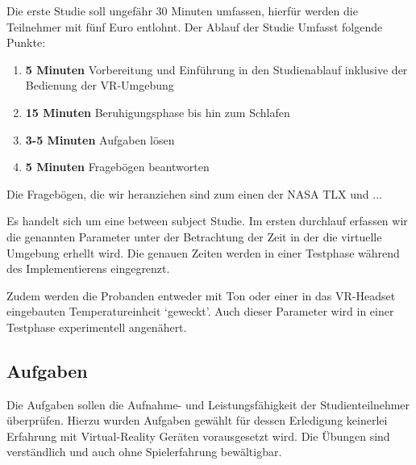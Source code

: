Die erste Studie soll ungefähr 30 Minuten umfassen, hierfür werden die Teilnehmer mit fünf Euro entlohnt. Der Ablauf der Studie Umfasst folgende Punkte:

\begin{enumerate}
	\item \textbf{5 Minuten} Vorbereitung und Einführung in den Studienablauf inklusive der Bedienung der VR-Umgebung
	\item \textbf{15 Minuten} Beruhigungsphase bis hin zum Schlafen
	\item \textbf{3-5 Minuten} Aufgaben lösen
	\item \textbf{5 Minuten} Fragebögen beantworten
\end{enumerate}

Die Fragebögen, die wir heranziehen sind zum einen der NASA TLX und ...

Es handelt sich um eine between subject Studie. Im ersten durchlauf erfassen wir die genannten Parameter unter der Betrachtung der Zeit in der die virtuelle Umgebung erhellt wird. Die genauen Zeiten werden in einer Testphase während des Implementierens eingegrenzt.

Zudem werden die Probanden entweder mit Ton oder einer in das VR-Headset eingebauten Temperatureinheit `geweckt'. Auch dieser Parameter wird in einer Testphase experimentell angenähert.

\subsection{Aufgaben}
Die Aufgaben sollen die Aufnahme- und Leistungsfähigkeit der Studienteilnehmer überprüfen. Hierzu wurden Aufgaben gewählt für dessen Erledigung keinerlei Erfahrung mit Virtual-Reality Geräten vorausgesetzt wird. Die Übungen sind verständlich und auch ohne Spielerfahrung bewältigbar. 

